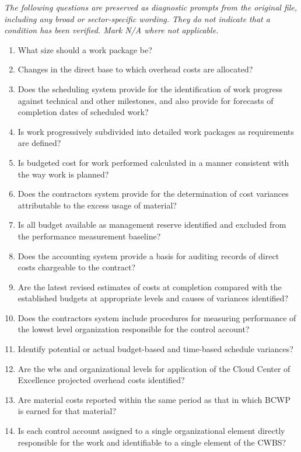 \documentclass[10pt,letterpaper]{article}
\newcommand{\docsection}[1]{\par\Needspace{5\baselineskip}\vspace{8pt}{\large\sffamily\bfseries\color{navy}#1}\par\vspace{2pt}{\color{rulegrey}\rule{\linewidth}{.6pt}}\par}
\begin{document}
\docsection{03 \quad Source diagnostic checklist}
\textit{The following questions are preserved as diagnostic prompts from the original file, including any broad or sector-specific wording. They do not indicate that a condition has been verified. Mark N/A where not applicable.}
\begingroup\small\begin{enumerate}[leftmargin=2.1em, itemsep=4pt]
\item[1.] What size should a work package be?
\item[2.] Changes in the direct base to which overhead costs are allocated?
\item[3.] Does the scheduling system provide for the identification of work progress against technical and other milestones, and also provide for forecasts of completion dates of scheduled work?
\item[4.] Is work progressively subdivided into detailed work packages as requirements are defined?
\item[5.] Is budgeted cost for work performed calculated in a manner consistent with the way work is planned?
\item[6.] Does the contractors system provide for the determination of cost variances attributable to the excess usage of material?
\item[7.] Is all budget available as management reserve identified and excluded from the performance measurement baseline?
\item[8.] Does the accounting system provide a basis for auditing records of direct costs chargeable to the contract?
\item[9.] Are the latest revised estimates of costs at completion compared with the established budgets at appropriate levels and causes of variances identified?
\item[10.] Does the contractors system include procedures for measuring performance of the lowest level organization responsible for the control account?
\item[11.] Identify potential or actual budget-based and time-based schedule variances?
\item[12.] Are the wbs and organizational levels for application of the Cloud Center of Excellence projected overhead costs identified?
\item[13.] Are material costs reported within the same period as that in which BCWP is earned for that material?
\item[14.] Is each control account assigned to a single organizational element directly responsible for the work and identifiable to a single element of the CWBS?

\end{enumerate}
\end{document}
